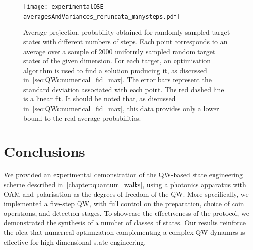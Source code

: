 \begin{figure}[tb]
    \centering
    \texttt{[image: experimentalQSE-averagesAndVariances\_rerundata\_manysteps.pdf]}
    \caption{
    	Average projection probability obtained for randomly sampled target states with different numbers of steps. Each point corresponds to an average over a sample of $2000$ uniformly sampled random target states of the given dimension. For each target, an optimisation algorithm is used to find a solution producing it, as discussed in~\cref{sec:QWs:numerical_fid_max}. The error bars represent the standard deviation associated with each point. The red dashed line is a linear fit. It should be noted that, as discussed in~\cref{sec:QWs:numerical_fid_max}, this data provides only a lower bound to the real average probabilities.%
    }
    \label{fig:expQWs:avgProbabilitiesVsStepNumber}
\end{figure}


\section{Conclusions}
\label{sec:expQWs:conclusions}

We provided an experimental demonstration of the \ac{QW}-based state engineering scheme described in~\cref{chapter:quantum_walks}, using a photonics apparatus with \ac{OAM} and polarisation as the degrees of freedom of the \ac{QW}.
More specifically, we implemented a five-step \ac{QW}, with full control on the preparation, choice of coin operations, and detection stages. To showcase the effectiveness of the protocol, we demonstrated the synthesis of a number of classes of states.
Our results reinforce the idea that numerical optimization complementing a complex \ac{QW} dynamics is effective for high-dimensional state engineering.
